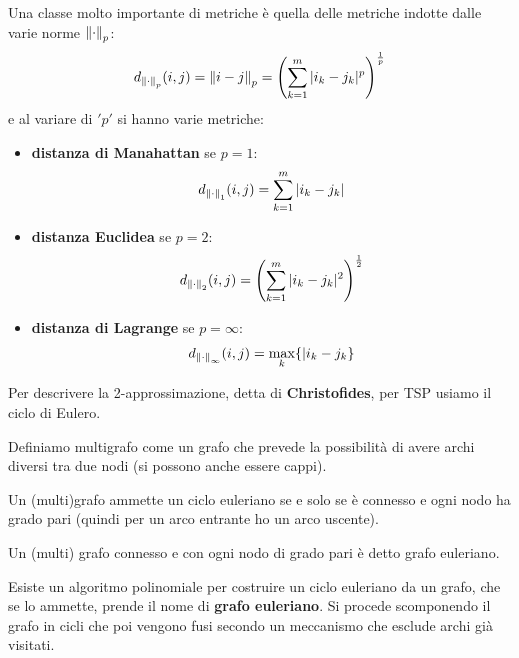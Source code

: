 										\begin{nota}
										        Una classe molto importante di metriche è quella delle metriche indotte dalle
										varie norme $\norm{\cdot}_p$:
										\[d_{\norm{\cdot}_p}(i,j)=\norm{i-j}_p=\left(\sum_{k=1}^m
											|i_k-j_k|^p\right)^{\frac{1}{p}}\]
											e al variare di $ 'p' $ si hanno varie metriche:
											\begin{itemize}
												\item \textbf{distanza di Manahattan} se $p=1$:
												      \[d_{\norm{\cdot}_1}(i,j)=\sum_{k=1}^m|i_k-j_k|\]
												\item \textbf{distanza Euclidea} se $p=2$:
												      \[d_{\norm{\cdot}_2}(i,j)=\left(\sum_{k=1}^m
												      	|i_k-j_k|^2\right)^{\frac{1}{2}}\]
												      	\item \textbf{distanza di Lagrange} se $p=\infty$:
												      	\[d_{\norm{\cdot}_\infty}(i,j)=\max_k\{|i_k-j_k\}\]
												      	\end{itemize}
										\end{nota}
												      	Per descrivere la 2-approssimazione, detta di \textbf{Christofides}, per TSP
												      	usiamo il ciclo di Eulero.
												      	\begin{definizione}
												      		Definiamo multigrafo come un grafo che prevede la possibilità di avere archi
												      		diversi tra due nodi (si possono anche essere cappi).
												      	\end{definizione}
												      	\begin{definizione}
												      		Un (multi)grafo ammette un ciclo euleriano se e solo se è connesso e ogni nodo
												      		ha grado pari (quindi per un arco entrante ho un arco uscente).\\
												      	\begin{corollario}
												      		Un (multi) grafo connesso e con ogni nodo di grado pari è detto grafo
												      		euleriano. 
												      	\end{corollario}
												      	\end{definizione}
												      					      	Esiste un algoritmo polinomiale per costruire un ciclo euleriano da un grafo,
												      	che se lo ammette, prende il nome di \textbf{grafo euleriano}. Si procede scomponendo il
												      	grafo in cicli che poi vengono fusi secondo un meccanismo che esclude archi già
												      	visitati.
